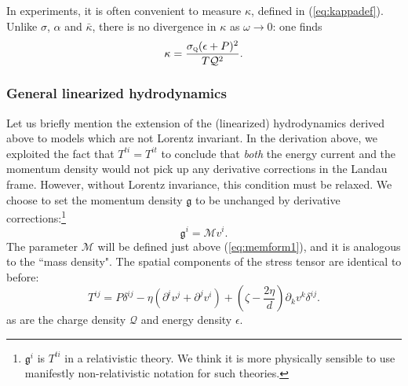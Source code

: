 \documentclass[10pt, oneside]{book}
\begin{document}
\begin{doublespace}
In experiments, it is often convenient to measure $\kappa$, defined in (\ref{eq:kappadef}).    Unlike $\sigma$, $\alpha$ and $\bar\kappa$, there is no divergence in $\kappa$ as $\omega \rightarrow 0$:  one finds \begin{equation}
\kappa = \frac{\sigma_{\textsc{q}}(\epsilon+P)^2}{T\mathcal{Q}^2}.
\end{equation}

  
\subsubsection{General linearized hydrodynamics}
Let us briefly mention the extension of the (linearized) hydrodynamics derived above to models which are not Lorentz invariant.   In the derivation above, we exploited the fact that $T^{ti} = T^{it}$ to conclude that \emph{both} the energy current and the momentum density would not pick up any derivative corrections in the Landau frame.    However, without Lorentz invariance, this condition must be relaxed.  We choose to set the momentum density $\mathfrak{g}$ to be unchanged by derivative corrections:\footnote{$\mathfrak{g}^i$ is $T^{ti}$ in a relativistic theory.  We think it is more physically sensible to use manifestly non-relativistic notation for such theories.}  \begin{equation}
\mathfrak{g}^i = \mathcal{M}v^i.
\end{equation}
The parameter $\mathcal{M}$ will be defined just above (\ref{eq:memform1}),  and it is analogous to the ``mass density".   The spatial components of the stress tensor are identical to before:  \begin{equation}
T^{ij} = P\delta^{ij} - \eta \left(\partial^i v^j + \partial^j v^i\right) + \left(\zeta-\frac{2\eta}{d}\right)\partial_k v^k \delta^{ij}.
\end{equation}
as are the charge density $\mathcal{Q}$ and energy density $\epsilon$.   


\end{doublespace}
\end{document}
